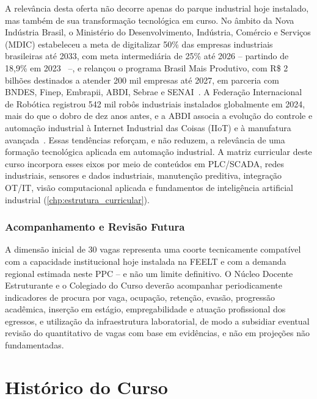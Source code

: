 A relevância desta oferta não decorre apenas do parque industrial hoje instalado, mas também de sua transformação tecnológica em curso. No âmbito da Nova Indústria Brasil, o Ministério do Desenvolvimento, Indústria, Comércio e Serviços (MDIC) estabeleceu a meta de digitalizar 50\% das empresas industriais brasileiras até 2033, com meta intermediária de 25\% até 2026 -- partindo de 18,9\% em 2023~\cite{mdic_nova_industria_brasil_2024} --, e relançou o programa Brasil Mais Produtivo, com R\$ 2 bilhões destinados a atender 200 mil empresas até 2027, em parceria com BNDES, Finep, Embrapii, ABDI, Sebrae e SENAI~\cite{mdic_nova_industria_brasil_2024}. A Federação Internacional de Robótica registrou 542 mil robôs industriais instalados globalmente em 2024, mais do que o dobro de dez anos antes, e a ABDI associa a evolução do controle e automação industrial à Internet Industrial das Coisas (IIoT) e à manufatura avançada~\cite{abdi_boas_praticas_produtivas_2024}. Essas tendências reforçam, e não reduzem, a relevância de uma formação tecnológica aplicada em automação industrial. A matriz curricular deste curso incorpora esses eixos por meio de conteúdos em PLC/SCADA, redes industriais, sensores e dados industriais, manutenção preditiva, integração OT/IT, visão computacional aplicada e fundamentos de inteligência artificial industrial (\autoref{chp:estrutura_curricular}).

\subsubsection{Acompanhamento e Revisão Futura}

A dimensão inicial de 30 vagas representa uma coorte tecnicamente compatível com a capacidade institucional hoje instalada na FEELT e com a demanda regional estimada neste PPC -- e não um limite definitivo. O Núcleo Docente Estruturante e o Colegiado do Curso deverão acompanhar periodicamente indicadores de procura por vaga, ocupação, retenção, evasão, progressão acadêmica, inserção em estágio, empregabilidade e atuação profissional dos egressos, e utilização da infraestrutura laboratorial, de modo a subsidiar eventual revisão do quantitativo de vagas com base em evidências, e não em projeções não fundamentadas.

\section{Histórico do Curso}
\label{sec:historico}

